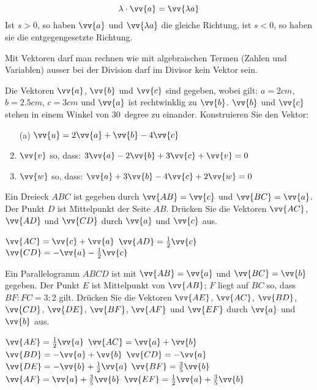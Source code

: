 \begin{theorem}
\[ \lambda \cdot \vv{a} = \vv{\lambda a} \]
Ist $s>0$, so haben $\vv{a}$ und $\vv{\lambda a}$ die gleiche Richtung,
ist $s<0$, so haben sie die entgegengesetzte Richtung.
\end{theorem}
Mit Vektoren darf man rechnen wie mit algebraischen Termen (Zahlen und Variablen) ausser bei der
Division darf im Divisor kein Vektor sein.

\begin{exercises}



\begin{exercise}
Die Vektoren $\vv{a}$, $\vv{b}$ und $\vv{c}$ sind gegeben, wobei gilt: $a=2cm$, $b=2.5cm$, $c=3cm$ und $\vv{a}$ ist rechtwinklig zu $\vv{b}$. $\vv{b}$ und $\vv{c}$ stehen in einem Winkel von \SI{30}{degree} zu einander.
Konstruieren Sie den Vektor:
\begin{enumerate}
\item[(a)]  $\vv{u} = 2 \vv{a} + \vv{b} - 4 \vv{c}$
\item   $\vv{v}$ so, dass: $3 \vv{a} - 2 \vv{b} + 3 \vv{c} + \vv{v} = 0$
\item $\vv{w}$ so, dass: $ \vv{a} +3 \vv{b} -4 \vv{c} + 2 \vv{w} = 0$
\end{enumerate}
\begin{answer}

\end{answer}
\end{exercise}

\begin{exercise}
Ein Dreieck $ABC$ ist gegeben durch $\vv{AB}=\vv{c}$ und $\vv{BC}=\vv{a}$.
Der Punkt $D$ ist Mittelpunkt der Seite $AB$.
Drücken Sie die Vektoren $\vv{AC}$, $\vv{AD}$ und $\vv{CD}$ durch $\vv{a}$ und $\vv{c}$ aus.

\begin{answer}
$\vv{AC} = \vv{c} + \vv{a}$
$\vv{AD} = \frac{1}{2} \vv{c}$
$\vv{CD} = - \vv{a} - \frac{1}{2} \vv{c}$
\end{answer}
\end{exercise}

\begin{exercise}
Ein Parallelogramm $ABCD$ ist mit $\vv{AB}=\vv{a}$ und $\vv{BC}=\vv{b}$ gegeben.
Der Punkt $E$ ist Mittelpunkt von $\vv{AB}$;
$F$ liegt auf $BC$ so, dass $BF:FC=3:2$ gilt.
Drücken Sie die Vektoren $\vv{AE}$, $\vv{AC}$, $\vv{BD}$, $\vv{CD}$, $\vv{DE}$, $\vv{BF}$, $\vv{AF}$ und $\vv{EF}$ durch $\vv{a}$ und $\vv{b}$ aus.
\begin{answer}
$\vv{AE} = \frac{1}{2} \vv{a}$ 
$\vv{AC} = \vv{a} + \vv{b}$
$\vv{BD} = -\vv{a} + \vv{b}$  
$\vv{CD} = -\vv{a}$
 $\vv{DE}= -\vv{b} + \frac{1}{2} \vv{a}$
$\vv{BF} = \frac{3}{5} \vv{b}$
$\vv{AF} = \vv{a} +\frac{3}{5} \vv{b}$
$\vv{EF} = \frac{1}{2} \vv{a} +\frac{3}{5} \vv{b}$
\end{answer}
\end{exercise}


\end{exercises}
